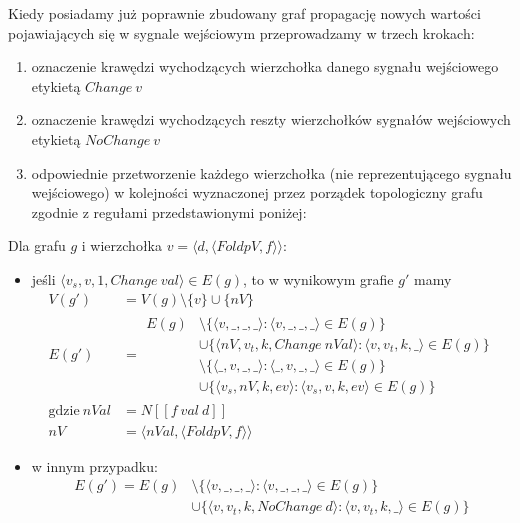 \documentclass[11pt,leqno]{article}
\begin{document}
Kiedy posiadamy już poprawnie zbudowany graf propagację nowych wartości pojawiających się w sygnale wejściowym przeprowadzamy w trzech krokach:
\begin{enumerate}
\item oznaczenie krawędzi wychodzących wierzchołka danego sygnału wejściowego etykietą $Change\:v$
\item oznaczenie krawędzi wychodzących reszty wierzchołków sygnałów wejściowych etykietą $NoChange\:v$ 
\item odpowiednie przetworzenie każdego wierzchołka (nie reprezentującego sygnału wejściowego) w kolejności wyznaczonej przez porządek topologiczny grafu zgodnie z regułami przedstawionymi poniżej:
\end{enumerate}
\newpage
Dla grafu $g$ i wierzchołka $v = \langle d, \langle FoldpV,f \rangle \rangle$:
\begin{itemize}
\item jeśli $ \langle v_s , v, 1, Change\:val \rangle \in E(g) $, to w wynikowym grafie $g'$ mamy
\begin {align*}
V(g') &= V(g) \setminus \{ v \} \cup \{ nV \} \\
E(g') &= \begin{aligned} E(g) &\setminus \{ \langle v, \_, \_, \_ \rangle : \langle v, \_ , \_, \_ \rangle \in E(g) \} \\ 
&\cup \{ \langle nV, v_t, k, Change\: nVal \rangle : \langle v, v_t , k, \_ \rangle \in E(g) \} \\
&\setminus \{ \langle \_, v, \_, \_ \rangle : \langle \_, v, \_, \_ \rangle \in E(g) \} \\
&\cup \{ \langle v_s, nV, k, ev \rangle : \langle v_s, v, k, ev \rangle \in E(g) \} \end{aligned} \\
\text{gdzie} \: nVal &= N [\![f \: val \: d]\!] \\
nV &= \langle nVal , \langle FoldpV,f \rangle \rangle
\end{align*}
\item w innym przypadku:
\begin{align*}
E(g') = E(g) &\setminus \{ \langle v, \_, \_, \_ \rangle : \langle v, \_, \_, \_ \rangle \in E(g) \} \\ 
&\cup \{ \langle v, v_t, k, NoChange\: d \rangle : \langle v, v_t , k, \_ \rangle \in E(g) \}
\end{align*}
\end{itemize}
\end{document}
